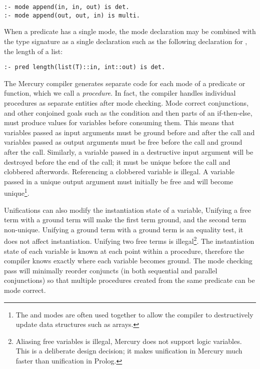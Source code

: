 \begin{verbatim}
:- mode append(in, in, out) is det.
:- mode append(out, out, in) is multi.
\end{verbatim}

\noindent
When a predicate has a single mode,
the mode declaration may be combined with the type signature as a single
declaration such as the following declaration for ,
the length of a list:

\begin{verbatim}
:- pred length(list(T)::in, int::out) is det.
\end{verbatim}

\noindent
The Mercury compiler generates separate code
for each mode of a predicate or function,
which we call a \emph{procedure}.
In fact, the compiler handles individual procedures as separate entities
after mode checking.
Mode correct conjunctions,
and other conjoined goals such as the condition and then parts of an
if-then-else,
must produce values for variables before consuming them.
This means that
variables passed as input arguments must be ground before and after the
call and
variables passed as output arguments must be free before the call and
ground after the call.
Similarly, a variable passed in a destructive input argument will be destroyed
before the end of the call;
it must be unique before the call and clobbered afterwords.
Referencing a clobbered variable is illegal.
A variable passed in a unique output argument must initially be free and
will become unique\footnote{
    The \di and \uo modes are often used together to allow the compiler to
    destructively update data structures such as arrays.}.

Unifications can also modify the instantiation state of a variable,
Unifying a free term with a ground term will make the first term ground,
and the second term non-unique.
Unifying a ground term with a ground term is an equality test,
it does not affect instantiation.
Unifying two free terms is illegal\footnote{
Aliasing free variables is illegal,
Mercury does not support logic variables.
This is a deliberate design decision;
it makes unification in Mercury much
faster than unification in Prolog.}.
The instantiation state of each variable is known at each point
within a procedure,
therefore
the compiler knows exactly where each variable becomes ground.
The mode checking pass will minimally reorder conjuncts 
(in both sequential and parallel conjunctions)
so that multiple procedures created from the same predicate can be mode
correct.

